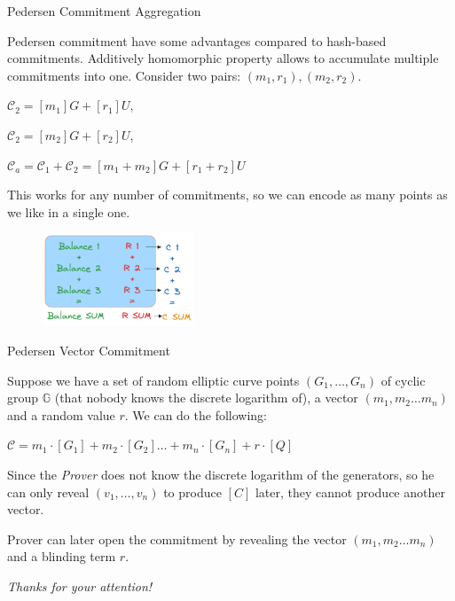 \documentclass[xcolor={usenames,dvipsnames}]{beamer}
\begin{document}
    \begin{frame}{Pedersen Commitment Aggregation}

        Pedersen commitment have some advantages compared to hash-based commitments.
        Additively homomorphic property allows to accumulate multiple commitments into one.
        Consider two pairs: $(m_1, r_1), (m_2, r_2)$.
        
        \begin{center}
            $\mathcal{C}_2 = [m_1]G + [r_1]U$,
        
            $\mathcal{C}_2 = [m_2]G + [r_2]U$,
        
            $\mathcal{C}_a = \mathcal{C}_1 + \mathcal{C}_2 = [m_1 + m_2]G + [r_1 + r_2]U$
        \end{center}
        
        This works for any number of commitments, so we can encode as many points as we like in a single one.

        \begin{figure}
            \centering
            \includegraphics[width=0.4\textwidth]{images/lecture_5/Balances.png}
        \end{figure}
        
\end{frame}

    \begin{frame}{Pedersen Vector Commitment}

        Suppose we have a set of random elliptic curve points $(G_1, \ldots ,G_n)$ of cyclic group $\mathbb{G}$ 
(that nobody knows the discrete logarithm of), a vector $(m_1, m_2 \ldots m_n)$ and a random value $r$. We can do the following:

\begin{center}
    $ \mathcal{C} = m_1\cdot[G_1] + m_2 \cdot [G_2] \ldots + m_n \cdot [G_n] + r \cdot [Q]$ 
\end{center}

Since the \textit{Prover} does not know the discrete logarithm of the generators, so he can only reveal $(v_1, \ldots ,v_n)$ to produce $[C]$ later, they cannot produce another vector.

Prover can later open the commitment by revealing the vector $(m_1, m_2 \ldots m_n)$ and a blinding term $r$.

        
\end{frame}


    
	\begin{frame}{}
      \centering \Large
      \emph{Thanks for your attention!}
    \end{frame}
\end{document}
